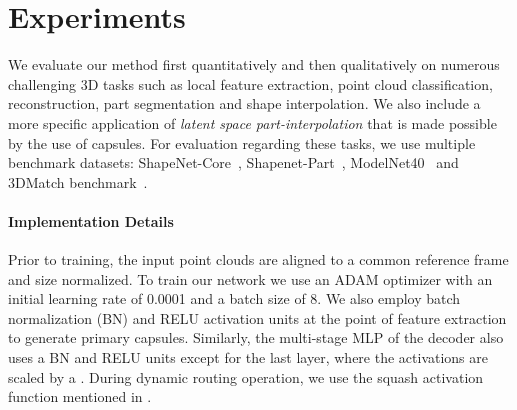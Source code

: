 \documentclass[10pt,twocolumn,letterpaper]{article}
\theoremstyle{break}
\begin{document}
%
 \section{Experiments}
\label{sec:experiments}

We evaluate our method first quantitatively and then qualitatively on numerous challenging 3D tasks such as local feature extraction, point cloud classification, reconstruction, part segmentation and shape interpolation. We also include a more specific application of \textit{latent space part-interpolation} that is made possible by the use of capsules. For evaluation regarding these tasks, we use multiple benchmark datasets: ShapeNet-Core~\cite{chang2015shapenet}, Shapenet-Part~\cite{yi2016scalable}, ModelNet40~\cite{wu20153d} and 3DMatch benchmark~\cite{zeng20163dmatch}.


\paragraph{Implementation Details}
Prior to training, the input point clouds are aligned to a common reference frame and size normalized. To train our network we use an ADAM optimizer with an initial learning rate of 0.0001 and a batch size of 8. We also employ batch normalization (BN) and RELU activation units at the point of feature extraction to generate primary capsules. Similarly, the multi-stage MLP of the decoder also uses a BN and RELU units except for the last layer, where the activations are scaled by a . During dynamic routing operation, we use the squash activation function mentioned in \cite{sabour2017dynamic,hinton2011transforming}.








\begin{table}[t]
  \centering
  \caption{Evaluating reconstruction quality. Oracle refers to a random sampling of the input 3D shape and constitutes an lower bound on what is achievable. The Chamfer Distance is multiplied by  for better viewing. CD denotes \textit{Chamfer distance} and PB refers to \textit{Point Baseline}.}
  \vspace{2pt}
    \vspace{-3mm}
\end{table} 
\end{document}
